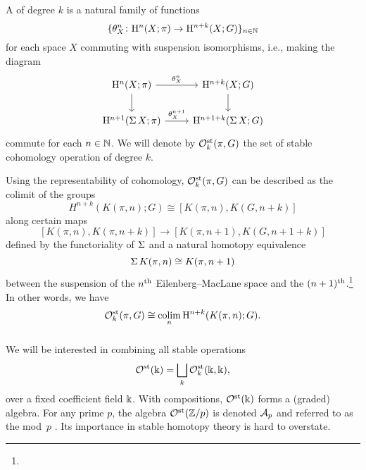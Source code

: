 \subsubsection{} A  of degree $k$ is a natural family of functions
\[
\{\theta^n_X \colon \mathrm{H}^n(X; \pi) \to \mathrm{H}^{n+k}(X; G)\}_{n \in \mathbb{N}}
\]
for each space $X$ commuting with suspension isomorphisms, i.e., making the diagram
\[
\begin{tikzcd}
	\rH^n(X; \pi) \rar["\theta^n_X"] \dar & \rH^{n+k}(X; G) \dar \\
	\rH^{n+1}(\sus X; \pi) \rar["\theta^{n+1}_X"] & \rH^{n+1+k}(\sus X; G)
\end{tikzcd}
\]
commute for each $n \in \mathbb{N}$.
We will denote by $\mathcal{O}^{\mathrm{st}}_k(\pi, G)$ the set of stable cohomology operation of degree $k$.


Using the representability of cohomology, $\mathcal{O}^{\mathrm{st}}_k(\pi, G)$ can be described as the colimit of the groups
\[
H^{n+k}(K(\pi, n); G) \cong [K(\pi, n), K(G, n+k)]
\]
along certain maps
\[
[K(\pi, n), K(\pi, n+k)] \to [K(\pi, n+1), K(G, n+1+k)]
\]
defined by the functoriality of $\operatorname{\Sigma}$ and a natural homotopy equivalence
\begin{equation}\label{eq:suspension of K(pi,n)}
	\operatorname{\Sigma} K(\pi, n) \cong K(\pi, n+1)
\end{equation}
between the suspension of the $n^{\mathrm{th}}$ Eilenberg--MacLane space and the $(n+1)^{\mathrm{th}}$.\footnote{}
In other words, we have
\[
\mathcal{O}^{\mathrm{st}}_k(\pi, G) \cong \operatorname*{colim}_n \mathrm{H}^{n+k}(K(\pi, n); G).
\]

\subsubsection{} We will be interested in combining all stable operations
\[
\mathcal{O}^{\mathrm{st}}(\Bbbk) = \bigsqcup_k \mathcal{O}^{\mathrm{st}}_k(\Bbbk, \Bbbk),
\]
over a fixed coefficient field $\Bbbk$.
With compositions, $\mathcal{O}^{\mathrm{st}}(\Bbbk)$ forms a (graded) algebra.
For any prime $p$, the algebra $\mathcal{O}^{\mathrm{st}}(\mathbb{Z}/p)$ is denoted $\mathcal{A}_p$ and referred to as the mod~$p$ .
Its importance in stable homotopy theory is hard to overstate.

